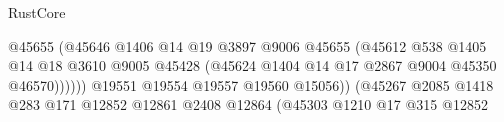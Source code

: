\begin{lexlean}{RustCore}
\begin{coremodule}
                                                        @45655
                                                        (@45646
                                                          @1406
                                                          @14
                                                          @19
                                                          @3897
                                                          @9006
                                                          @45655
                                                          (@45612
                                                            @538
                                                            @1405
                                                            @14
                                                            @18
                                                            @3610
                                                            @9005
                                                            @45428
                                                            (@45624
                                                              @1404
                                                              @14
                                                              @17
                                                              @2867
                                                              @9004
                                                              @45350
                                                              @46570))))))
                                                  @19551
                                                  @19554
                                                  @19557
                                                  @19560
                                                  @15056))
                                              (@45267
                                                @2085
                                                @1418
                                                @283
                                                @171
                                                @12852
                                                @12861
                                                @2408
                                                @12864
                                                (@45303
                                                  @1210
                                                  @17
                                                  @315
                                                  @12852

\end{coremodule}
\end{lexlean}
